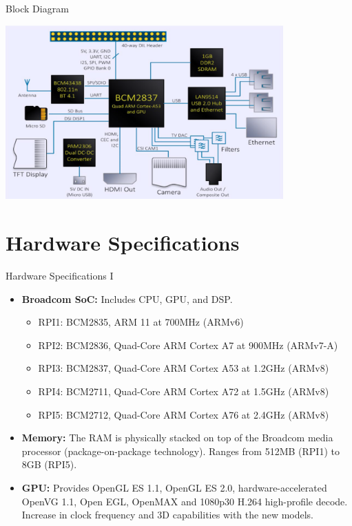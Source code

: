 \begin{frame}{Block Diagram}
  \begin{center}
    \includegraphics[width=0.8\textwidth]{trainingmaterials/rpibasics/rpiblockdiagram.png} %
  \end{center}
\end{frame}

\section{Hardware Specifications}
\begin{frame}{Hardware Specifications I}
  \begin{itemize}
  \item \textbf{Broadcom SoC:} Includes CPU, GPU, and DSP.
      \begin{itemize}
        \item RPI1: BCM2835, ARM 11 at 700MHz (ARMv6)
        \item RPI2: BCM2836, Quad-Core ARM Cortex A7 at 900MHz (ARMv7-A)
        \item RPI3: BCM2837, Quad-Core ARM Cortex A53 at 1.2GHz (ARMv8)
        \item RPI4: BCM2711, Quad-Core ARM Cortex A72 at 1.5GHz (ARMv8)
        \item RPI5: BCM2712, Quad-Core ARM Cortex A76 at 2.4GHz (ARMv8)
      \end{itemize}   
  \item \textbf{Memory:} The RAM is physically stacked on top of the Broadcom media processor (package-on-package technology). Ranges from 512MB (RPI1) to 8GB (RPI5).
  \item \textbf{GPU: }Provides OpenGL ES 1.1, OpenGL ES 2.0, hardware-accelerated OpenVG 1.1, Open EGL, OpenMAX and 1080p30 H.264 high-profile decode. Increase in clock frequency and 3D capabilities with the new models.
   \end{itemize}
\end{frame}

